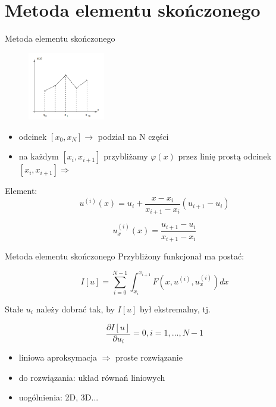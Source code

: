 \section{Metoda elementu skończonego}

	\begin{frame}{Metoda elementu skończonego}
		\begin{figure}
			\includegraphics[width=0.3\textwidth]{img/19/fin_elem_method}
		\end{figure}
		
		\begin{itemize}
			\item odcinek $[x_0, x_N] \rightarrow$ podział na N części
			\item na każdym $[x_i, x_{i+1}]$ przybliżamy $\varphi(x)$ przez linię prostą odcinek $[x_i, x_{i+1}] \Rightarrow$
		\end{itemize}
		Element:
		$$
		u^{(i)}(x) = u_i + \frac{x - x_i}{x_{i+1} - x_i}(u_{i+1} - u_i)
		$$
		
		$$
		u_x^{(i)}(x) = \frac{u_{i+1} - u_i}{x_{i+1} - x_i}
		$$
		
	\end{frame}
	
	
	\begin{frame}{Metoda elementu skończonego}
		Przybliżony funkcjonał ma postać:
		
		$$
		I[u] = \sum_{i=0}^{N-1} \int_{x_i}^{x_{i+1}} F(x, u^{(i)}, u_x^{(i)} ) dx
		$$
		
		Stałe $u_i$ należy dobrać tak, by $I[u]$ był ekstremalny, tj.
		
		$$
		\frac{\partial I[u]}{\partial u_i} = 0, i = 1, ... , N-1
		$$
		
		
		\begin{itemize}
			\item liniowa aproksymacja $\Rightarrow$ proste rozwiązanie
			\item do rozwiązania: układ równań liniowych
			\item uogólnienia: 2D, 3D...
		\end{itemize}
		
	\end{frame}




